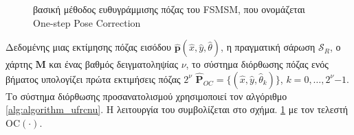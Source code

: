 \begin{figure}[!h]\centering
  
  \caption{\small  βασική μέθοδος ευθυγράμμισης πόζας του FSMSM, που ονομάζεται
           One-step Pose Correction}
  \label{fig:02_04_04:inner_system}
\end{figure}


Δεδομένης μιας εκτίμησης πόζας εισόδου $\hat{\bm{p}}(\hat{x}, \hat{y},
\hat{\theta})$, η πραγματική σάρωση $\mathcal{S}_R$, ο χάρτης $\bm{M}$ και ένας
βαθμός δειγματοληψίας $\nu$, το σύστημα διόρθωσης πόζας ενός βήματος υπολογίζει
πρώτα εκτιμήσεις πόζας $2^\nu$ $\hat{\bm{P}}_{OC} = \{(\hat{x}, \hat{y},
\hat{\theta}_k)\}$, $k = 0,\dots,2^\nu$$-$$1$. Το σύστημα διόρθωσης
προσανατολισμού χρησιμοποιεί τον αλγόριθμο \ref{alg:algorithm_ufrcnu}. Η
λειτουργία του συμβολίζεται στο σχήμα.  \ref{fig:02_04_04:inner_system} με τον τελεστή
OC$(\cdot)$.

